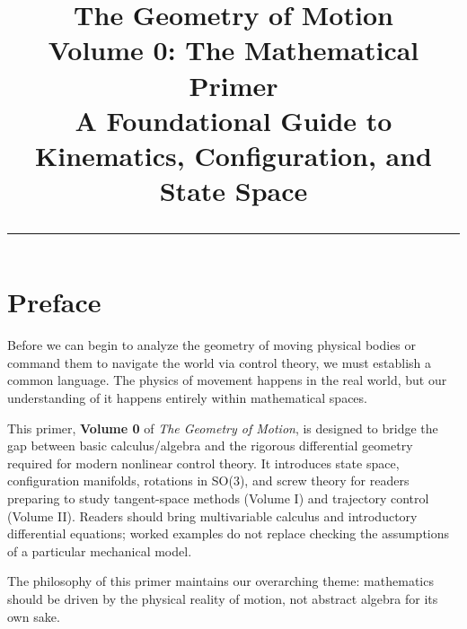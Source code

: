 \documentclass[10pt,letterpaper,openany]{book}
\title{%
  {\Huge\bfseries\color{chapblue} The Geometry of Motion}\\[0.4cm]
  {\Large Volume 0: The Mathematical Primer\\
  A Foundational Guide to Kinematics, Configuration, and State Space}\\[0.6cm]
  {\color{chapblue}\rule{\textwidth}{2pt}}
}
\date{}
\theoremstyle{plain}
\theoremstyle{remark}
\theoremstyle{plain}
\begin{document}
\maketitle
\thispagestyle{empty}
\cleardoublepage

\frontmatter
\chapter*{Preface}

Before we can begin to analyze the geometry of moving physical bodies or command them to navigate the world via control theory, we must establish a common language. The physics of movement happens in the real world, but our understanding of it happens entirely within mathematical spaces.

This primer, \textbf{Volume 0} of \textit{The Geometry of Motion}, is designed to bridge the gap between basic calculus/algebra and the rigorous differential geometry required for modern nonlinear control theory. It introduces state space, configuration manifolds, rotations in SO(3), and screw theory for readers preparing to study tangent-space methods (Volume I) and trajectory control (Volume II). Readers should bring multivariable calculus and introductory differential equations; worked examples do not replace checking the assumptions of a particular mechanical model.

The philosophy of this primer maintains our overarching theme: mathematics should be driven by the physical reality of motion, not abstract algebra for its own sake.

\tableofcontents

\cleardoublepage

\mainmatter














\backmatter


\printindex



\end{document}
